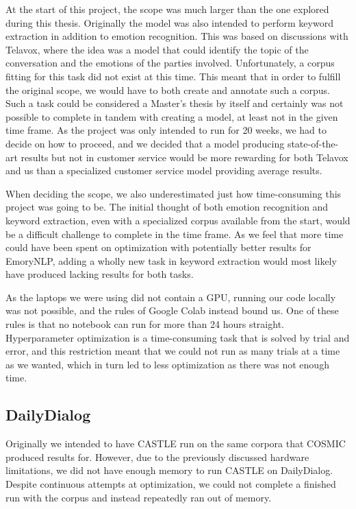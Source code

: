 \documentclass[nofilelist]{cslthse-msc}
\begin{document}
At the start of this project, the scope was much larger than the one explored during this thesis. Originally the model was also intended to perform keyword extraction in addition to emotion recognition. This was based on discussions with Telavox, where the idea was a model that could identify the topic of the conversation and the emotions of the parties involved. Unfortunately, a corpus fitting for this task did not exist at this time. This meant that in order to fulfill the original scope, we would have to both create and annotate such a corpus. Such a task could be considered a Master's thesis by itself and certainly was not possible to complete in tandem with creating a model, at least not in the given time frame. As the project was only intended to run for 20 weeks, we had to decide on how to proceed, and we decided that a model producing state-of-the-art results but not in customer service would be more rewarding for both Telavox and us than a specialized customer service model providing average results. 

When deciding the scope, we also underestimated just how time-consuming this project was going to be. The initial thought of both emotion recognition and keyword extraction, even with a specialized corpus available from the start, would be a difficult challenge to complete in the time frame. As we feel that more time could have been spent on optimization with potentially better results for EmoryNLP, adding a wholly new task in keyword extraction would most likely have produced lacking results for both tasks.

As the laptops we were using did not contain a GPU, running our code locally was not possible, and the rules of Google Colab instead bound us. One of these rules is that no notebook can run for more than 24 hours straight. Hyperparameter optimization is a time-consuming task that is solved by trial and error, and this restriction meant that we could not run as many trials at a time as we wanted, which in turn led to less optimization as there was not enough time.


\subsection*{DailyDialog}
Originally we intended to have CASTLE run on the same corpora that COSMIC produced results for. However, due to the previously discussed hardware limitations, we did not have enough memory to run CASTLE on DailyDialog. Despite continuous attempts at optimization, we could not complete a finished run with the corpus and instead repeatedly ran out of memory. 
\end{document}
